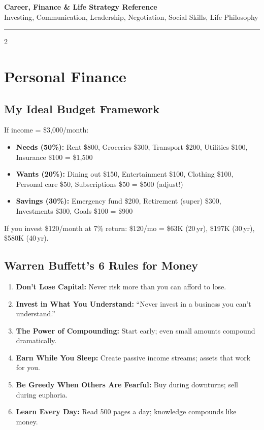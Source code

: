 \documentclass[10pt,a4paper]{article}
\begin{document}
\begin{center}
{\LARGE\bfseries\color{accent} Career, Finance \& Life Strategy Reference}\\[4pt]
{\small Investing, Communication, Leadership, Negotiation, Social Skills, Life Philosophy}
\end{center}
\vspace{4pt}\hrule\vspace{6pt}

\begin{multicols}{2}

\section{Personal Finance}

\subsection{My Ideal Budget Framework}
If income = \$3,000/month:
\begin{itemize}
\item \textbf{Needs (50\%):} Rent \$800, Groceries \$300, Transport \$200, Utilities \$100, Insurance \$100 = \$1,500
\item \textbf{Wants (20\%):} Dining out \$150, Entertainment \$100, Clothing \$100, Personal care \$50, Subscriptions \$50 = \$500 (adjust!)
\item \textbf{Savings (30\%):} Emergency fund \$200, Retirement (super) \$300, Investments \$300, Goals \$100 = \$900
\end{itemize}
If you invest \$120/month at 7\% return: \$120/mo = \$63K (20\,yr), \$197K (30\,yr), \$580K (40\,yr).

\subsection{Warren Buffett's 6 Rules for Money}
\begin{enumerate}
\item \textbf{Don't Lose Capital:} Never risk more than you can afford to lose.
\item \textbf{Invest in What You Understand:} ``Never invest in a business you can't understand.''
\item \textbf{The Power of Compounding:} Start early; even small amounts compound dramatically.
\item \textbf{Earn While You Sleep:} Create passive income streams; assets that work for you.
\item \textbf{Be Greedy When Others Are Fearful:} Buy during downturns; sell during euphoria.
\item \textbf{Learn Every Day:} Read 500 pages a day; knowledge compounds like money.
\end{enumerate}


\end{multicols}
\end{document}
